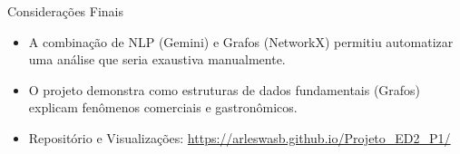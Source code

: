 \documentclass[10pt]{beamer}
\begin{document}
\begin{frame}{Considerações Finais}
    \begin{itemize}
        \item A combinação de NLP (Gemini) e Grafos (NetworkX) permitiu automatizar uma análise que seria exaustiva manualmente.
        \item O projeto demonstra como estruturas de dados fundamentais (Grafos) explicam fenômenos comerciais e gastronômicos.
        \item Repositório e Visualizações: \url{https://arleswasb.github.io/Projeto_ED2_P1/}
    \end{itemize}
\end{frame}
\end{document}
